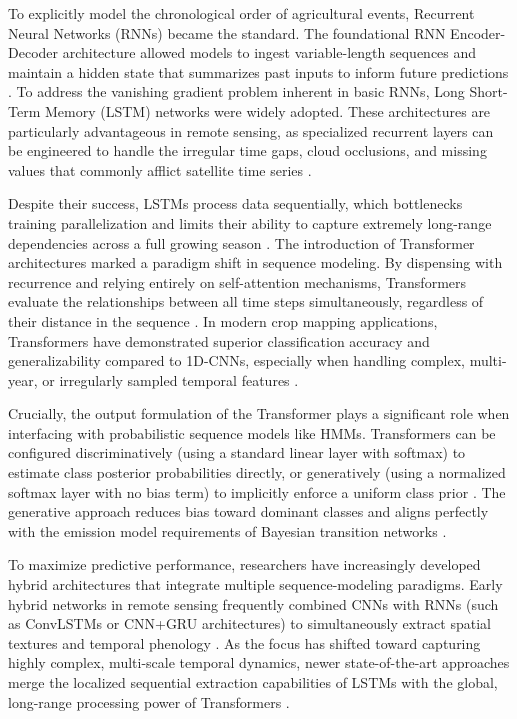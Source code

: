 To explicitly model the chronological order of agricultural events, Recurrent Neural Networks (RNNs) became the standard.
The foundational RNN Encoder-Decoder architecture allowed models to ingest variable-length sequences and maintain a hidden state that summarizes
past inputs to inform future predictions \cite{cho_learning_2014}. To address the vanishing gradient problem inherent in basic RNNs,
Long Short-Term Memory (LSTM) networks were widely adopted. These architectures are particularly advantageous in remote sensing,
as specialized recurrent layers can be engineered to handle the irregular time gaps, cloud occlusions,
and missing values that commonly afflict satellite time series \cite{zhao_recurrent_2021}. 

Despite their success, LSTMs process data sequentially, which bottlenecks training parallelization and limits their ability to capture
extremely long-range dependencies across a full growing season \cite{zhou_improved_2024}.
The introduction of Transformer architectures marked a paradigm shift in sequence modeling.
By dispensing with recurrence and relying entirely on self-attention mechanisms, Transformers evaluate the relationships between all time steps simultaneously,
regardless of their distance in the sequence \cite{zhou_improved_2024}.
In modern crop mapping applications, Transformers have demonstrated superior classification accuracy and generalizability compared to 1D-CNNs,
especially when handling complex, multi-year, or irregularly sampled temporal features \cite{pham_temporally_2024}.

Crucially, the output formulation of the Transformer plays a significant role when interfacing with probabilistic sequence models like HMMs. 
Transformers can be configured discriminatively (using a standard linear layer with softmax) to estimate class posterior probabilities directly, 
or generatively (using a normalized softmax layer with no bias term) to implicitly enforce a uniform class prior \cite{perantoni_bayesian_2024}. 
The generative approach reduces bias toward dominant classes and aligns perfectly with the emission model requirements of Bayesian transition networks \cite{perantoni_bayesian_2024}.

To maximize predictive performance, researchers have increasingly developed hybrid architectures that integrate multiple sequence-modeling paradigms.
Early hybrid networks in remote sensing frequently combined CNNs with RNNs (such as ConvLSTMs or CNN+GRU architectures)
to simultaneously extract spatial textures and temporal phenology \cite{sainte_fare_garnot_time_2019}.
As the focus has shifted toward capturing highly complex, multi-scale temporal dynamics,
newer state-of-the-art approaches merge the localized sequential extraction capabilities of LSTMs with the global,
long-range processing power of Transformers \cite{guo_dual_2025, zhou_improved_2024}.

